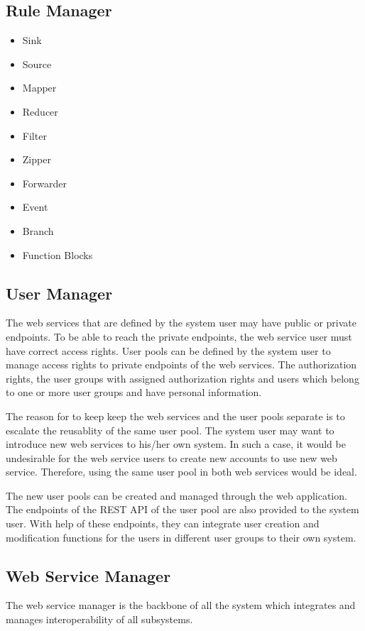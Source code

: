 \subsection{Rule Manager}
\label{ss:rule_manager}

\begin{itemize}
  \item Sink

  \item Source
  \item Mapper
  \item Reducer
  \item Filter
  \item Zipper
  \item Forwarder
  \item Event
  \item Branch
  \item Function Blocks
\end{itemize}

\subsection{User Manager}

The web services that are defined by the system user may have public or private endpoints. To be able to reach the private endpoints, the web service user must have correct access rights. User pools can be defined by the system user to manage access rights to private endpoints of the web services. The authorization rights, the user groups with assigned authorization rights and users which belong to one or more user groups and have personal information. 

The reason for to keep keep the web services and the user pools separate is to escalate the reusablity of the same user pool. The system user may want to introduce new web services to his/her own system. In such a case, it would be undesirable for the web service users to create new accounts to use new web service. Therefore, using the same user pool in both web services would be ideal. 

The new user pools can be created and managed through the web application. The endpoints of the REST API of the user pool are also provided to the system user. With help of these endpoints, they can integrate user creation and modification functions for the users in different user groups to their own system.


\subsection{Web Service Manager}

The web service manager is the backbone of all the system which integrates and manages interoperability of all subsystems. 

